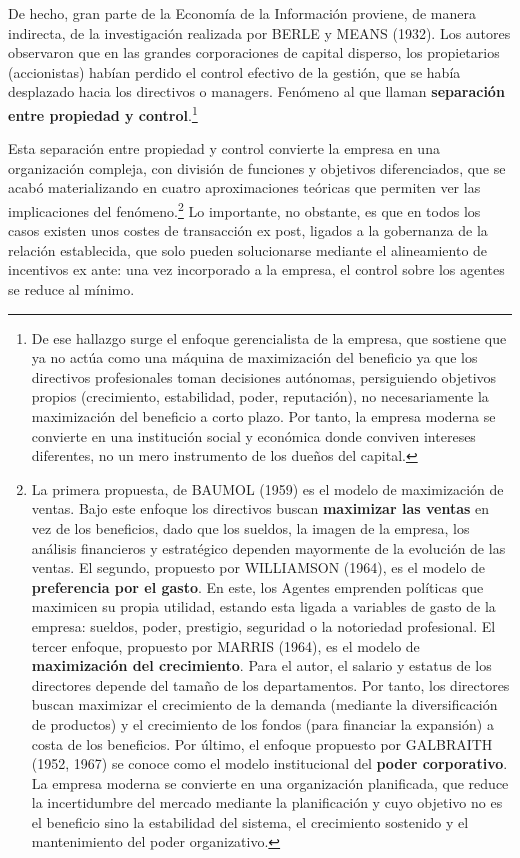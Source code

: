 \documentclass[10pt,a4paper]{article}
\begin{document}
De hecho, gran parte de la Economía de la Información proviene, de manera indirecta, de la investigación realizada por BERLE y MEANS (1932). Los autores observaron que en las grandes corporaciones de capital disperso, los propietarios (accionistas) habían perdido el control efectivo de la gestión, que se había desplazado hacia los directivos o managers. Fenómeno al que llaman \textbf{separación entre propiedad y control}.\footnote{%
  De ese hallazgo surge el enfoque gerencialista de la empresa, que sostiene que ya no actúa como una máquina de maximización del beneficio ya que los directivos profesionales toman decisiones autónomas, persiguiendo objetivos propios (crecimiento, estabilidad, poder, reputación), no necesariamente la maximización del beneficio a corto plazo. Por tanto, la empresa moderna se convierte en una institución social y económica donde conviven intereses diferentes, no un mero instrumento de los dueños del capital.
}

Esta separación entre propiedad y control convierte la empresa en una organización compleja, con división de funciones y objetivos diferenciados, que se acabó materializando en cuatro aproximaciones teóricas que permiten ver las implicaciones del fenómeno.\footnote{%
  La primera propuesta, de BAUMOL (1959) es el modelo de maximización de ventas. Bajo este enfoque los directivos buscan \textbf{maximizar las ventas} en vez de los beneficios, dado que los sueldos, la imagen de la empresa, los análisis financieros y estratégico dependen mayormente de la evolución de las ventas. El segundo, propuesto por WILLIAMSON (1964), es el modelo de \textbf{preferencia por el gasto}. En este, los Agentes emprenden políticas que maximicen su propia utilidad, estando esta ligada a variables de gasto de la empresa: sueldos, poder, prestigio, seguridad o la notoriedad profesional. El tercer enfoque, propuesto por MARRIS (1964), es el modelo de \textbf{maximización del crecimiento}. Para el autor, el salario y estatus de los directores depende del tamaño de los departamentos. Por tanto, los directores buscan maximizar el crecimiento de la demanda (mediante la diversificación de productos) y el crecimiento de los fondos (para financiar la expansión) a costa de los beneficios. Por último, el enfoque propuesto por GALBRAITH (1952, 1967) se conoce como el modelo institucional del \textbf{poder corporativo}. La empresa moderna se convierte en una organización planificada, que reduce la incertidumbre del mercado mediante la planificación y cuyo objetivo no es el beneficio sino la estabilidad del sistema, el crecimiento sostenido y el mantenimiento del poder organizativo.
} Lo importante, no obstante, es que en todos los casos existen unos costes de transacción ex post, ligados a la gobernanza de la relación establecida, que solo pueden solucionarse mediante el alineamiento de incentivos ex ante: una vez incorporado a la empresa, el control sobre los agentes se reduce al mínimo.
\end{document}
